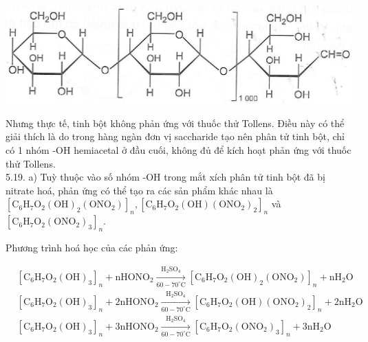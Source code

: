 \documentclass[10pt]{article}
\begin{document}
\begin{center}
\includegraphics[max width=\textwidth]{2025_10_23_b4e16b74380d0f7e7700g-036}
\end{center}

Nhưng thực tế, tinh bột không phản ứng với thuốc thử Tollens. Điều này có thể giải thích là do trong hàng ngàn đơn vị saccharide tạo nên phân tử tinh bột, chỉ có 1 nhóm -OH hemiacetal ở đầu cuối, không đủ để kích hoạt phản ứng với thuốc thử Tollens.\\
5.19. a) Tuỳ thuộc vào số nhóm -OH trong mắt xích phân tử tinh bột đã bị nitrate hoá, phản ứng có thể tạo ra các sản phẩm khác nhau là $\left[\mathrm{C}_{6} \mathrm{H}_{7} \mathrm{O}_{2}(\mathrm{OH})_{2}\left(\mathrm{ONO}_{2}\right)\right]_{n},\left[\mathrm{C}_{6} \mathrm{H}_{7} \mathrm{O}_{2}(\mathrm{OH})\left(\mathrm{ONO}_{2}\right)_{2}\right]_{n}$ và $\left[\mathrm{C}_{6} \mathrm{H}_{7} \mathrm{O}_{2}\left(\mathrm{ONO}_{2}\right)_{3}\right]_{n}$.

Phương trình hoá học của các phản ứng:

$$
\begin{aligned}
& {\left[\mathrm{C}_{6} \mathrm{H}_{7} \mathrm{O}_{2}(\mathrm{OH})_{3}\right]_{n}+\mathrm{nHONO}_{2} \xrightarrow[60-70^{\circ} \mathrm{C}]{\mathrm{H}_{2} \mathrm{SO}_{4}}\left[\mathrm{C}_{6} \mathrm{H}_{7} \mathrm{O}_{2}(\mathrm{OH})_{2}\left(\mathrm{ONO}_{2}\right)\right]_{n}+\mathrm{nH}_{2} \mathrm{O}} \\
& {\left[\mathrm{C}_{6} \mathrm{H}_{7} \mathrm{O}_{2}(\mathrm{OH})_{3}\right]_{n}+2 \mathrm{nHONO}_{2} \xrightarrow[60-70^{\circ} \mathrm{C}]{\mathrm{H}_{2} \mathrm{SO}_{4}}\left[\mathrm{C}_{6} \mathrm{H}_{7} \mathrm{O}_{2}(\mathrm{OH})\left(\mathrm{ONO}_{2}\right)_{2}\right]_{n}+2 \mathrm{nH}_{2} \mathrm{O}} \\
& {\left[\mathrm{C}_{6} \mathrm{H}_{7} \mathrm{O}_{2}(\mathrm{OH})_{3}\right]_{n}+3 \mathrm{nHONO}_{2} \xrightarrow[60-70^{\circ} \mathrm{C}]{\mathrm{H}_{2} \mathrm{SO}_{4}}\left[\mathrm{C}_{6} \mathrm{H}_{7} \mathrm{O}_{2}\left(\mathrm{ONO}_{2}\right)_{3}\right]_{n}+3 \mathrm{nH}_{2} \mathrm{O}}
\end{aligned}
$$
\end{document}
